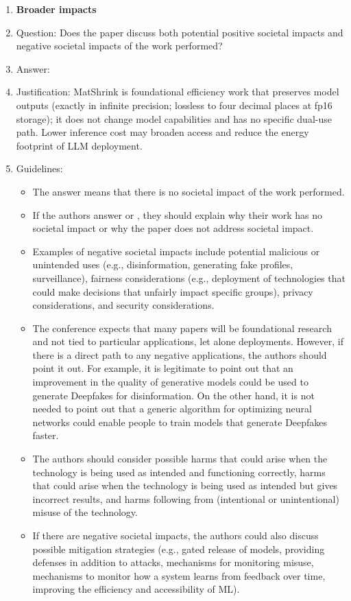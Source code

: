 \begin{enumerate}
\item {\bf Broader impacts}
    \item[] Question: Does the paper discuss both potential positive societal impacts and negative societal impacts of the work performed?
    \item[] Answer: \answerNA{} %
    \item[] Justification: MatShrink is foundational efficiency work that preserves model outputs (exactly in infinite precision; lossless to four decimal places at fp16 storage); it does not change model capabilities and has no specific dual-use path. Lower inference cost may broaden access and reduce the energy footprint of LLM deployment.
    \item[] Guidelines:
    \begin{itemize}
        \item The answer \answerNA{} means that there is no societal impact of the work performed.
        \item If the authors answer \answerNA{} or \answerNo, they should explain why their work has no societal impact or why the paper does not address societal impact.
        \item Examples of negative societal impacts include potential malicious or unintended uses (e.g., disinformation, generating fake profiles, surveillance), fairness considerations (e.g., deployment of technologies that could make decisions that unfairly impact specific groups), privacy considerations, and security considerations.
        \item The conference expects that many papers will be foundational research and not tied to particular applications, let alone deployments. However, if there is a direct path to any negative applications, the authors should point it out. For example, it is legitimate to point out that an improvement in the quality of generative models could be used to generate Deepfakes for disinformation. On the other hand, it is not needed to point out that a generic algorithm for optimizing neural networks could enable people to train models that generate Deepfakes faster.
        \item The authors should consider possible harms that could arise when the technology is being used as intended and functioning correctly, harms that could arise when the technology is being used as intended but gives incorrect results, and harms following from (intentional or unintentional) misuse of the technology.
        \item If there are negative societal impacts, the authors could also discuss possible mitigation strategies (e.g., gated release of models, providing defenses in addition to attacks, mechanisms for monitoring misuse, mechanisms to monitor how a system learns from feedback over time, improving the efficiency and accessibility of ML).
    \end{itemize}


\end{enumerate}
